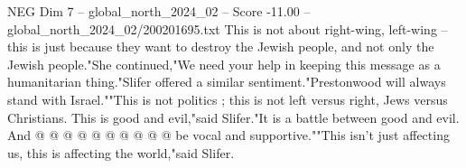 \begin{textsample}{NEG Dim 7 – global\_north\_2024\_02 – Score -11.00 – global\_north\_2024\_02/200201695.txt}
This is not about right-wing, left-wing -- this is just because they want to destroy the Jewish people, and not only the Jewish people."She continued,"We need your help in keeping this message as a humanitarian thing."Slifer offered a similar sentiment."Prestonwood will always stand with Israel.""This is not politics ; this is not left versus right, Jews versus Christians.
This is good and evil,"said Slifer."It is a battle between good and evil.
And @ @ @ @ @ @ @ @ @ @ be vocal and supportive.""This isn't just affecting us, this is affecting the world,"said Slifer.

\end{textsample}
